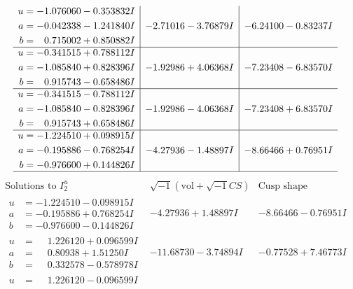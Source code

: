 \documentclass[1p]{elsarticle_modified}
\theoremstyle{definition}
\newcommand{\I}{\sqrt{-1}}
\begin{document}
$$\begin{array}{c|c|c}
\begin{aligned}
u &= -1.076060 - 0.353832 I \\
a &= -0.042338 - 1.241840 I \\
b &= \phantom{-}0.715002 + 0.850882 I\end{aligned}
 & -2.71016 - 3.76879 I & -6.24100 - 0.83237 I \\ \hline\begin{aligned}
u &= -0.341515 + 0.788112 I \\
a &= -1.085840 + 0.828396 I \\
b &= \phantom{-}0.915743 - 0.658486 I\end{aligned}
 & -1.92986 + 4.06368 I & -7.23408 - 6.83570 I \\ \hline\begin{aligned}
u &= -0.341515 - 0.788112 I \\
a &= -1.085840 - 0.828396 I \\
b &= \phantom{-}0.915743 + 0.658486 I\end{aligned}
 & -1.92986 - 4.06368 I & -7.23408 + 6.83570 I \\ \hline\begin{aligned}
u &= -1.224510 + 0.098915 I \\
a &= -0.195886 - 0.768254 I \\
b &= -0.976600 + 0.144826 I\end{aligned}
 & -4.27936 - 1.48897 I & -8.66466 + 0.76951 I\\
 \hline 
 \end{array}$$\newpage$$\begin{array}{c|c|c}  
\text{Solutions to }I^u_{2}& \I (\text{vol} + \sqrt{-1}CS) & \text{Cusp shape}\\
 \hline 
\begin{aligned}
u &= -1.224510 - 0.098915 I \\
a &= -0.195886 + 0.768254 I \\
b &= -0.976600 - 0.144826 I\end{aligned}
 & -4.27936 + 1.48897 I & -8.66466 - 0.76951 I \\ \hline\begin{aligned}
u &= \phantom{-}1.226120 + 0.096599 I \\
a &= \phantom{-}0.80938 + 1.51250 I \\
b &= \phantom{-}0.332578 - 0.578978 I\end{aligned}
 & -11.68730 - 3.74894 I & -0.77528 + 7.46773 I \\ \hline\begin{aligned}
u &= \phantom{-}1.226120 - 0.096599 I \\

\end{aligned}
\end{array}$$
\end{document}
